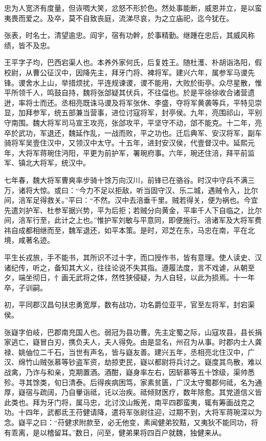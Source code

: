\documentclass[12pt,UTF8]{ctexbook}
\begin{document}
忠为人宽济有度量，但诙啁大笑，忿怒不形於色。然处事能断，威恩并立，是以蛮夷畏而爱之。及卒，莫不自致丧庭，流涕尽哀，为之立庙祀，迄今犹在。

张表，时名士，清望逾忠。阎宇，宿有功幹，於事精勤。继踵在忠后，其威风称绩，皆不及忠。

王平字子均，巴西宕渠人也。本养外家何氏，后复姓王。随杜濩、朴胡诣洛阳，假校尉，从曹公征汉中，因降先主，拜牙门将、裨将军。建兴六年，属参军马谡先锋。谡舍水上山，举措烦扰，平连规谏谡，谡不能用，大败於街亭。众尽星散，惟平所领千人，鸣鼓自持，魏将张郃疑其伏兵，不往偪也。於是平徐徐收合诸营遗迸，率将士而还。丞相亮既诛马谡及将军张休、李盛，夺将军黄袭等兵，平特见崇显，加拜参军，统五部兼当营事，进位讨寇将军，封亭侯。九年，亮围祁山，平别守南围。魏大将军司马宣王攻亮，张郃攻平，平坚守不动，郃不能克。十二年，亮卒於武功，军退还，魏延作乱，一战而败，平之功也。迁后典军、安汉将军，副车骑将军吴壹住汉中，又领汉中太守。十五年，进封安汉侯，代壹督汉中。延熙元年，大将军蒋琬住沔阳，平更为前护军，署琬府事。六年，琬还住涪，拜平前监军、镇北大将军，统汉中。

七年春，魏大将军曹爽率步骑十馀万向汉川，前锋已在骆谷。时汉中守兵不满三万，诸将大惊。或曰：“今力不足以拒敌，听当固守汉、乐二城，遇贼令入，比尔间，涪军足得救关。”平曰：“不然。汉中去涪垂千里。贼若得关，便为祸也。今宜先遣刘护军、杜参军据兴势，平为后拒；若贼分向黄金，平率千人下自临之，比尔间，涪军行至，此计之上也。”惟护军刘敏与平意同，即便施行。涪诸军及大将军费祎自成都相继而至，魏军退还，如平本策。是时，邓芝在东，马忠在南，平在北境，咸著名迹。

平生长戎旅，手不能书，其所识不过十字，而口授作书，皆有意理。使人读史、汉诸纪传，听之，备知其大义，往往论说不失其指。遵履法度，言不戏谑，从朝至夕，端坐彻日，忄画无武将之体，然性狭侵疑，为人自轻，以此为损焉。十一年卒，子训嗣。

初，平同郡汉昌句扶忠勇宽厚，数有战功，功名爵位亚平，官至左将军，封宕渠侯。

张嶷字伯岐，巴郡南充国人也。弱冠为县功曹。先主定蜀之际，山寇攻县，县长捐家逃亡，嶷冒白刃，携负夫人，夫人得免。由是显名，州召为从事。时郡内士人龚禄、姚伷位二千石，当世有声名，皆与嶷友善。建兴五年，丞相亮北住汉中，广汉、绵竹山贼张慕等钞盗军资，劫掠吏民，嶷以都尉将兵讨之。嶷度其鸟散，难以战禽，乃诈与和亲，克期置酒。酒酣，嶷身率左右，因斩慕等五十馀级，渠帅悉殄。寻其馀类，旬日清泰。后得疾病困笃，家素贫匮，广汉太守蜀郡何祗，名为通厚，嶷宿与疏阔，乃自轝诣祗，讬以治疾。祗倾财医疗，数年除愈。其党道信义皆此类也。拜为牙门将，属马忠，北讨汶山叛羌，南平四郡蛮夷，辄有筹画战克之功。十四年，武都氐王苻健请降，遣将军张尉往迎，过期不到，大将军蒋琬深以为念。嶷平之曰：“苻健求附款至，必无他变，素闻健弟狡黠，又夷狄不能同功，将有乖离，是以稽留耳。”数日，问至，健弟果将四百户就魏，独健来从。
\end{document}
